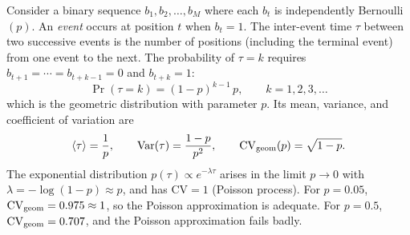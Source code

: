 \documentclass[preprint]{elsarticle}
\newcommand{\meantau}{\langle\tau\rangle}
\newcommand{\CV}{\mathrm{CV}}
\newcommand{\TODO}[1]{\textcolor{red}{\textbf{[TODO: #1]}}}
\newcommand{\NOTE}[1]{\textcolor{blue}{\textbf{[NOTE: #1]}}}
\begin{document}
Consider a binary sequence $b_1, b_2, \ldots, b_M$ where each $b_t$
is independently Bernoulli$(p)$.
An \emph{event} occurs at position $t$ when $b_t = 1$.
The inter-event time $\tau$ between two successive events is the number
of positions (including the terminal event) from one event to the next.
The probability of $\tau = k$ requires $b_{t+1} = \cdots = b_{t+k-1}
= 0$ and $b_{t+k} = 1$:
\begin{equation}
  \Pr(\tau = k) = (1-p)^{k-1}\,p, \qquad k = 1, 2, 3, \ldots
\end{equation}
which is the geometric distribution with parameter $p$.
Its mean, variance, and coefficient of variation are
\begin{equation}
  \meantau = \frac{1}{p},
  \qquad
  \mathrm{Var}(\tau) = \frac{1-p}{p^2},
  \qquad
  \CV_{\rm geom}(p) = \sqrt{1-p}.
\end{equation}
The exponential distribution $p(\tau) \propto e^{-\lambda\tau}$ arises
in the limit $p \to 0$ with $\lambda = -\log(1-p) \approx p$, and has
$\CV = 1$ (Poisson process).
For $p = 0.05$, $\CV_{\rm geom} = 0.975 \approx 1$, so the Poisson
approximation is adequate.
For $p = 0.5$, $\CV_{\rm geom} = 0.707$, and the Poisson
approximation fails badly.


%
\end{document}
